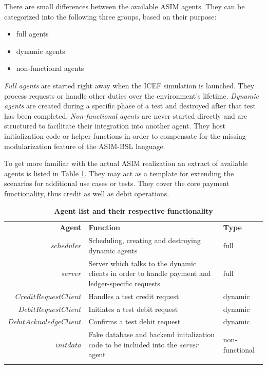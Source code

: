 There are small differences between the available ASIM agents. They can be categorized into the following three groups, based on their purpose:
\begin{itemize}
	\item full agents
	\item dynamic agents
	\item non-functional agents
\end{itemize}
\textit{Full agents} are started right away when the ICEF simulation is launched. They process requests or handle other duties over the environment's lifetime. \textit{Dynamic agents} are created during a specific phase of a test and destroyed after that test has been completed. \textit{Non-functional agents} are never started directly and are structured to facilitate their integration into another agent. They host initialization code or helper functions in order to compensate for the missing modularization feature of the ASIM-BSL language.

To get more familiar with the actual ASIM realization an extract of available agents is listed in Table \ref{tab:model-agents}. They may act as a template for extending the scenarios for additional use cases or tests. They cover the core payment functionality, thus credit as well as debit operations.

\begin{table}[H]
\begin{centering}
\small
{
\begin{tabular}{ r | p{9cm} | l }
\hline
\textbf{Agent}	& \textbf{Function} & \textbf{Type} \\
\Xhline{1.5pt}
$scheduler$				& Scheduling, creating and destroying dynamic agents & full\\[3pt]
\hline
$server$				& Server which talks to the dynamic clients in order to handle payment and ledger-specific requests & full\\[3pt]
\hline
$CreditRequestClient$	& Handles a test credit request & dynamic\\[3pt]
\hline
$DebitRequestClient$	& Initiates a test debit request & dynamic\\[3pt]
\hline
$DebitAcknoledgeClient$	& Confirms a test debit request & dynamic\\[3pt]
\hline
$initdata$				& Fake database and backend initalization code to be included into the \textit{server} agent & non-functional\\[3pt]
\Xhline{1.5pt}
\end{tabular}
}
\caption{\small\textbf{Agent list and their respective functionality}}
\label{tab:model-agents}
\end{centering}
\vspace{-0.5cm}
\end{table}

